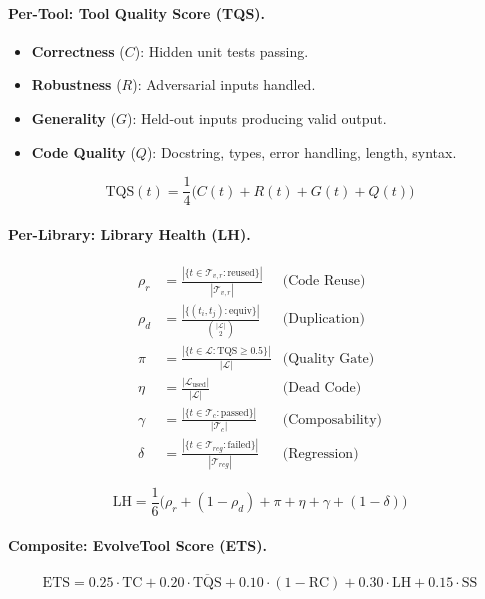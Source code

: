 \documentclass[10pt,twocolumn]{article}
\begin{document}
\paragraph{Per-Tool: Tool Quality Score (TQS).}
\begin{itemize}
\item \textbf{Correctness} ($C$): Hidden unit tests passing.
\item \textbf{Robustness} ($R$): Adversarial inputs handled.
\item \textbf{Generality} ($G$): Held-out inputs producing valid output.
\item \textbf{Code Quality} ($Q$): Docstring, types, error handling, length, syntax.
\end{itemize}

\begin{equation}
\text{TQS}(t) = \frac{1}{4}\bigl(C(t) + R(t) + G(t) + Q(t)\bigr)
\end{equation}

\paragraph{Per-Library: Library Health (LH).}
\begin{align}
\rho_r &= \frac{|\{t \in \mathcal{T}_{v,r} : \text{reused}\}|}{|\mathcal{T}_{v,r}|} & \text{(Code Reuse)} \\[2pt]
\rho_d &= \frac{|\{(t_i,t_j) : \text{equiv}\}|}{\binom{|\mathcal{L}|}{2}} & \text{(Duplication)} \\[2pt]
\pi &= \frac{|\{t \in \mathcal{L} : \text{TQS} \geq 0.5\}|}{|\mathcal{L}|} & \text{(Quality Gate)} \\[2pt]
\eta &= \frac{|\mathcal{L}_{\text{used}}|}{|\mathcal{L}|} & \text{(Dead Code)} \\[2pt]
\gamma &= \frac{|\{t \in \mathcal{T}_c : \text{passed}\}|}{|\mathcal{T}_c|} & \text{(Composability)} \\[2pt]
\delta &= \frac{|\{t \in \mathcal{T}_{reg} : \text{failed}\}|}{|\mathcal{T}_{reg}|} & \text{(Regression)}
\end{align}

\begin{equation}
\text{LH} = \frac{1}{6}\bigl(\rho_r + (1{-}\rho_d) + \pi + \eta + \gamma + (1{-}\delta)\bigr)
\end{equation}

\paragraph{Composite: EvolveTool Score (ETS).}
\begin{equation}
\text{ETS} = 0.25 \!\cdot\! \text{TC} + 0.20 \!\cdot\! \overline{\text{TQS}} + 0.10 \!\cdot\! (1{-}\text{RC}) + 0.30 \!\cdot\! \text{LH} + 0.15 \!\cdot\! \text{SS}
\end{equation}
\end{document}
